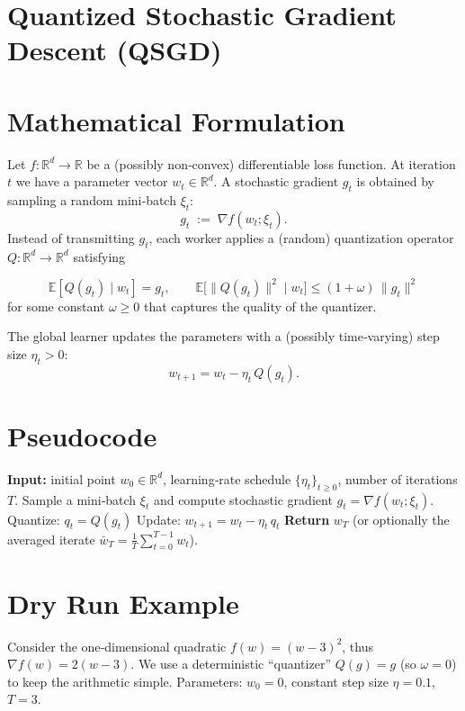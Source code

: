 \documentclass{article}
\newcommand{\E}{\mathbb{E}}
\newcommand{\R}{\mathbb{R}}
\begin{document}
\section*{Quantized Stochastic Gradient Descent (QSGD)}

\section*{Mathematical Formulation}
Let $f:\R^{d}\rightarrow\R$ be a (possibly non‑convex) differentiable loss function.  
At iteration $t$ we have a parameter vector $w_{t}\in\R^{d}$.  
A stochastic gradient $g_{t}$ is obtained by sampling a random mini‑batch
$\xi_{t}$:
\[
g_{t}\;:=\;\nabla f(w_{t};\xi_{t}) .
\]
Instead of transmitting $g_{t}$, each worker applies a (random) quantization
operator $Q:\R^{d}\rightarrow\R^{d}$ satisfying

\[
\boxed{\E[Q(g_{t})\mid w_{t}]=g_{t}},\qquad 
\boxed{\E\!\big[\|Q(g_{t})\|^{2}\mid w_{t}\big]\leq (1+\omega)\,\|g_{t}\|^{2}}
\tag{1}
\]
for some constant $\omega\ge 0$ that captures the quality of the quantizer.

The global learner updates the parameters with a (possibly time‑varying) step
size $\eta_{t}>0$:
\[
\boxed{w_{t+1}=w_{t}-\eta_{t}\,Q(g_{t})}. \tag{2}
\]

\section*{Pseudocode}
\begin{algorithm}[H]
\caption{Quantized Stochastic Gradient Descent}
\begin{algorithmic}[1]
\State \textbf{Input:} initial point $w_{0}\in\R^{d}$, learning‑rate schedule
$\{\eta_{t}\}_{t\ge0}$, number of iterations $T$.
    \State Sample a mini‑batch $\xi_{t}$ and compute stochastic gradient 
          $g_{t}= \nabla f(w_{t};\xi_{t})$.
    \State Quantize: $q_{t}=Q(g_{t})$   \hfill{}
    \State Update: $w_{t+1}= w_{t}-\eta_{t}\,q_{t}$   \hfill{}
\EndFor
\State \textbf{Return} $w_{T}$ (or optionally the averaged iterate
$\bar w_{T}= \frac{1}{T}\sum_{t=0}^{T-1} w_{t}$).
\end{algorithmic}
\end{algorithm}

\section*{Dry Run Example}
Consider the one‑dimensional quadratic $f(w)=(w-3)^{2}$, thus
$\nabla f(w)=2(w-3)$.  We use a deterministic ``quantizer'' $Q(g)=g$ (so
$\omega=0$) to keep the arithmetic simple.  Parameters:
$w_{0}=0$, constant step size $\eta=0.1$, $T=3$.
\end{document}
